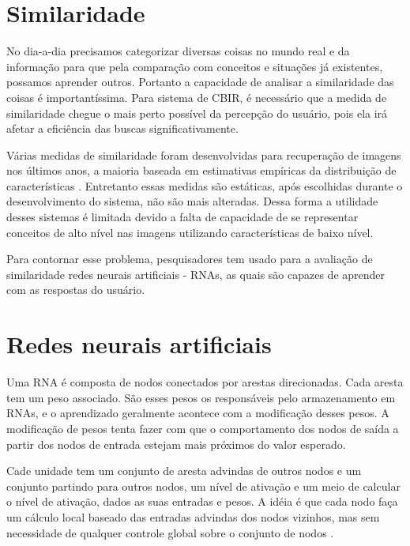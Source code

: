 \section{Similaridade}

No dia-a-dia precisamos categorizar diversas coisas no mundo real e da informação para que pela comparação com conceitos e situações já existentes, possamos aprender outros. Portanto a capacidade de analisar a similaridade das coisas é importantíssima. Para sistema de CBIR, é necessário que a medida de similaridade chegue o mais perto possível da percepção do usuário, pois ela irá afetar a eficiência das buscas significativamente.

Várias medidas de similaridade foram desenvolvidas para recuperação de imagens nos últimos anos, a maioria baseada em estimativas empíricas da distribuição de características \cite{feng-chapter}. Entretanto essas medidas são estáticas, após escolhidas durante o desenvolvimento do sistema, não são mais alteradas. Dessa forma a utilidade desses sistemas é limitada devido a falta de capacidade de se representar conceitos de alto nível nas imagens utilizando características de baixo nível.

Para contornar esse problema, pesquisadores \cite{mammography} \cite{cbir-nn-general} tem usado para a avaliação de similaridade redes neurais artificiais - RNAs, as quais são capazes de aprender com as respostas do usuário.

\section{Redes neurais artificiais}

Uma RNA é composta de nodos conectados por arestas direcionadas. Cada aresta tem um peso associado. São esses pesos os responsáveis pelo armazenamento em RNAs, e o aprendizado geralmente acontece com a modificação desses pesos. A modificação de pesos tenta fazer com que o comportamento dos nodos de saída a partir dos nodos de entrada estejam mais próximos do valor esperado.

Cade unidade tem um conjunto de aresta advindas de outros nodos e um conjunto partindo para outros nodos, um nível de ativação e um meio de calcular o nível de ativação, dados as suas entradas e pesos. A idéia é que cada nodo faça um cálculo local baseado das entradas advindas dos nodos vizinhos, mas sem necessidade de qualquer controle global sobre o conjunto de nodos \cite{russel:modern}.


